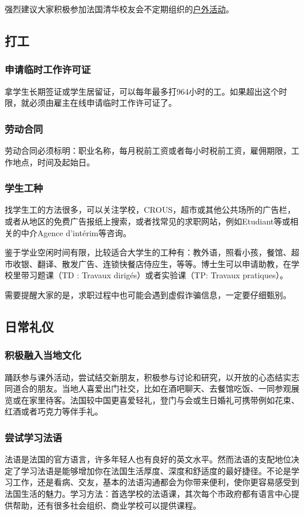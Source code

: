 \documentclass[UTF8]{ctexart}
\begin{document}
强烈建议大家积极参加法国清华校友会不定期组织的\href{https://www.tsinghua-france.org/category/activities/outdoor/}{户外活动}。

\subsection{打工}
\subsubsection{申请临时工作许可证}
拿学生长期签证或学生居留证，可以每年最多打964小时的工。如果超出这个时限，就必须由雇主在线申请临时工作许可证了。

\subsubsection{劳动合同}
劳动合同必须标明：职业名称，每月税前工资或者每小时税前工资，雇佣期限，工作地点，时间及起始日。

\subsubsection{学生工种}
找学生工的方法很多，可以关注学校，CROUS，超市或其他公共场所的广告栏，或者从地区的免费广告报纸上搜索，或者找常见的求职⽹站，例如Etudiant等或相关的中介Agence d’intérim等咨询。

鉴于学业空闲时间有限，比较适合大学生的工种有：教外语，照看小孩，餐馆、超市收银、翻译、散发广告、连锁快餐店侍应生，等等。博士生可以申请助教，在学校里带习题课（TD : Travaux dirigés）或者实验课（TP: Travaux pratiques）。

需要提醒⼤家的是，求职过程中也可能会遇到虚假诈骗信息，⼀定要仔细甄别。

\subsection{日常礼仪}
\subsubsection{积极融入当地文化}
踊跃参与课外活动，尝试结交新朋友，积极参与讨论和研究，以开放的心态结实志同道合的朋友。当地人喜爱出门社交，比如在酒吧聊天、去餐馆吃饭、一同参观展览或在家里待客。法国较中国更喜爱轻礼，登门与会或生日婚礼可携带例如花束、红酒或者巧克力等伴手礼。

\subsubsection{尝试学习法语}
法语是法国的官方语言，许多年轻人也有良好的英文水平。然而法语的支配地位决定了学习法语是能够增加你在法国生活厚度、深度和舒适度的最好捷径。不论是学习工作，还是看病、交友，基本的法语沟通都会为你带来便利，使你更容易感受到法国生活的魅力。学习方法：首选学校的法语课，其次每个市政府都有语言中心提供帮助，还有很多社会组织、商业学校可以提供课程。
\end{document}
